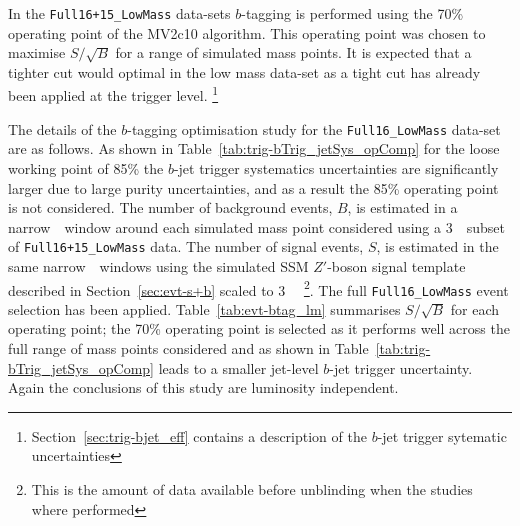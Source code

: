 In the \verb|Full16+15_LowMass| data-sets $b$-tagging is performed using the 70\% operating point of the MV2c10 algorithm.
This operating point was chosen to maximise $S/\sqrt{B}$ for a range of simulated mass points.
It is expected that a tighter cut would optimal in the low mass data-set as a tight cut has already been applied at the trigger level.
\footnote{Section~\ref{sec:trig-bjet_eff} contains a description of the $b$-jet trigger sytematic uncertainties}

The details of the $b$-tagging optimisation study for the \verb|Full16_LowMass| data-set are as follows.
As shown in Table~\ref{tab:trig-bTrig_jetSys_opComp}
for the loose working point of 85\% the $b$-jet trigger systematics uncertainties
are significantly larger due to large purity uncertainties, and as a result the 85\% operating point is not considered.
The number of background events, $B$, is estimated in
a narrow~\mjj~window around each simulated mass point considered using a
3~\ifb~subset of \verb|Full16+15_LowMass| data.
The number of signal events, $S$, is estimated
in the same narrow~\mjj~windows using 
the simulated SSM $Z'$-boson signal template
described in Section~\ref{sec:evt-s+b} scaled to 3~\ifb~
\footnote{This is the amount of data available before unblinding when the studies where performed}.
The full \verb|Full16_LowMass| event selection has been applied.
Table~\ref{tab:evt-btag_lm} summarises $S/\sqrt{B}$ for each operating point;
the 70\% operating point is selected as it performs well across the full range of mass points considered
and as shown in Table~\ref{tab:trig-bTrig_jetSys_opComp} leads to a smaller jet-level $b$-jet trigger uncertainty.
Again the conclusions of this study are luminosity independent.

